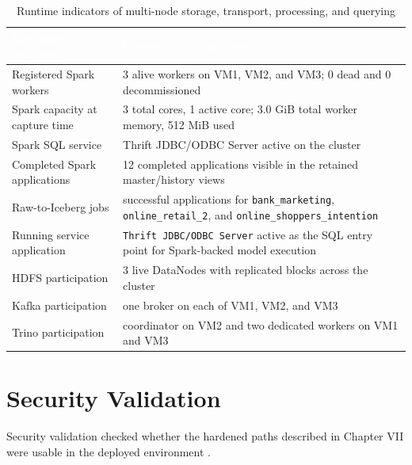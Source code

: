 \begin{table}[!htbp]
    \centering
    \footnotesize
    \renewcommand{\arraystretch}{1.14}
    \begin{tabularx}{\textwidth}{|L{0.37\textwidth}|Y|}
        \hline
        \textcolor{white}{\textbf{Distributed indicator}} & \textcolor{white}{\textbf{Observed runtime result}} \\
        \hline
        Registered Spark workers & 3 alive workers on VM1, VM2, and VM3; 0 dead and 0 decommissioned \\
        \hline
        Spark capacity at capture time & 3 total cores, 1 active core; 3.0 GiB total worker memory, 512 MiB used \\
        \hline
        Spark SQL service & Thrift JDBC/ODBC Server active on the cluster \\
        \hline
        Completed Spark applications & 12 completed applications visible in the retained master/history views \\
        \hline
        Raw-to-Iceberg jobs & successful applications for \texttt{bank\_marketing}, \texttt{online\_retail\_2}, and \texttt{online\_shoppers\_intention} \\
        \hline
        Running service application & \texttt{Thrift JDBC/ODBC Server} active as the SQL entry point for Spark-backed model execution \\
        \hline
        HDFS participation & 3 live DataNodes with replicated blocks across the cluster \\
        \hline
        Kafka participation & one broker on each of VM1, VM2, and VM3 \\
        \hline
        Trino participation & coordinator on VM2 and two dedicated workers on VM1 and VM3 \\
        \hline
    \end{tabularx}
    \caption{Runtime indicators of multi-node storage, transport, processing, and querying}
    \label{tab:chapter8-distributed-execution-evidence}
\end{table}
\FloatBarrier

\section{Security Validation}
Security validation checked whether the hardened paths described in Chapter VII were usable in the deployed environment \cite{mit_kerberos_docs,apache_hadoop_docs,trino_docs,openssh_docs,cryptsetup_docs}.

